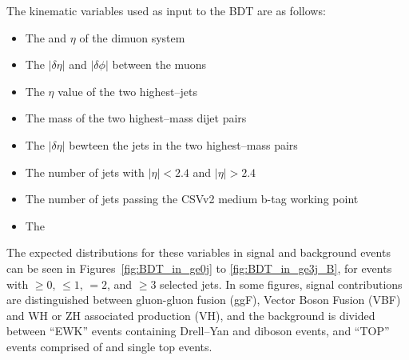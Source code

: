 The kinematic variables used as input to the BDT are as follows:
\begin{itemize}
\item The \pt and $\eta$ of the dimuon system
\item The $|\delta\eta|$ and $|\delta\phi|$ between the muons
\item The $\eta$ value of the two highest--\pt jets
\item The mass of the two highest--mass dijet pairs
\item The $|\delta\eta|$ bewteen the jets in the two highest--mass pairs
\item The number of jets with $|\eta| < 2.4$ and $|\eta| > 2.4$
\item The number of jets passing the CSVv2 medium b-tag working point
\item The \MET
\end{itemize}

The expected distributions for these variables in signal and background events
can be seen in Figures~\ref{fig:BDT_in_ge0j} to \ref{fig:BDT_in_ge3j_B}, for events
with $\ge 0$, $\le 1$, $= 2$, and $\ge 3$ selected jets.  In some figures, signal
contributions are distinguished between gluon-gluon fusion (ggF), Vector Boson Fusion
(VBF) and WH or ZH associated production (VH), and the background is divided between
``EWK'' events containing Drell--Yan and diboson events, and ``TOP'' events comprised
of \ttbar and single top events.

\clearpage

